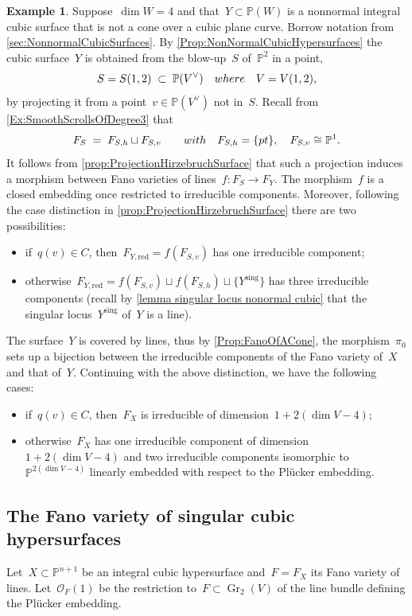 \documentclass[a4paper]{amsart}
\newcommand{\bbP}{\mathbb{P}}
\newcommand{\cO}{\mathcal{O}}
\newcommand{\sing}{{\mathrm{sing}}}
\newcommand{\red}{{\mathrm{red}}}
\DeclareMathOperator{\Gr}{Gr}
\theoremstyle{plain}
\theoremstyle{definition}
\newtheorem{example}[theorem]{Example}
\numberwithin{equation}{section}
\begin{document}
\begin{example} \label{Ex:ConesOverNonnormalCubicSurfaces} Suppose~$\dim W = 4$ and that~$Y \subset \bbP(W)$ is a nonnormal integral cubic surface that is not a cone over a cubic plane curve. Borrow notation from \cref{sec:NonnormalCubicSurfaces}. 
%
By \cref{Prop:NonNormalCubicHypersurfaces} the cubic surface~$Y$ is obtained from 
the blow-up~$S$ of~$\bbP^2$ in a point,
\[ S = S(1, 2) \; \subset \; \bbP(V^\vee) \quad \textup{where} \quad V = V(1,2), \]
by projecting it from a point~$v \in \bbP(V^\vee)$ not in~$S$. Recall from \cref{Ex:SmoothScrollsOfDegree3} that 
\[ F_{S} \; = \; F_{S, h} \sqcup F_{S, v} \qquad \textup{with} \quad F_{S, h} = 
\{ \textup{pt} \}, \quad F_{S,v} \cong \bbP^1. \]
It follows from \cref{prop:ProjectionHirzebruchSurface} that such a projection induces a morphism between Fano varieties of lines~$f \colon F_S \to F_Y$. The morphism~$f$ is a closed embedding once restricted to irreducible components. Moreover, following the case distinction in \cref{prop:ProjectionHirzebruchSurface} there are two possibilities:
\begin{itemize}
\item if~$q(v) \in C$, then~$F_{Y, \red} = f(F_{S, v})$ has one irreducible component; \smallskip
\item otherwise~$F_{Y, \red} = f(F_{S, v}) \sqcup f(F_{S, h}) \sqcup \{ Y^\sing \}$ has three irreducible components (recall by \cref{lemma singular locus nonormal cubic} that the singular locus~$Y^\sing$ of~$Y$ is a line).
\end{itemize}
The surface~$Y$ is covered by lines, thus by \cref{Prop:FanoOfACone}, the morphism~$\pi_{0}$ sets up a bijection between the irreducible components of the Fano variety of~$X$ and that of~$Y$. Continuing with the above distinction, we have the following cases:
\begin{itemize}
\item if~$q(v) \in C$, then~$F_X$ is irreducible of dimension~$1 + 2 (\dim V - 4)$; \smallskip
\item otherwise~$F_X$ has one irreducible component of dimension~$1 + 2 (\dim V - 4)$ and two irreducible components isomorphic to~$\bbP^{2 (\dim V - 4)}$ linearly embedded with respect to the Pl\"ucker embedding.
\end{itemize}
\end{example}



\subsection{The Fano variety of singular cubic hypersurfaces} Let~$X \subset \bbP^{n+1}$ be an integral cubic hypersurface and~$F = F_X$ its Fano variety of lines. Let~$\cO_F(1)$ be the restriction to~$F \subset \Gr_2(V)$ of the line bundle defining the Pl\"ucker embedding.
\end{document}

